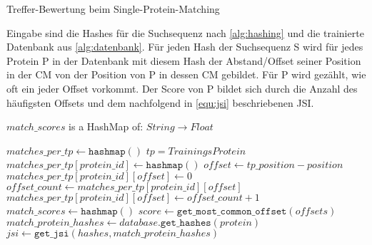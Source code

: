 \begin{enumerate}[a)]
                \newcommand{\Width}{\dimexpr\textwidth-\leftmargin}
                \begin{minipage}{\Width}
                    \begin{algorithm}[H]
                        \caption{Treffer-Bewertung beim Single-Protein-Matching}\label{alg:scoring}
                        Eingabe sind die Hashes für die Suchsequenz nach \autoref{alg:hashing} und die trainierte Datenbank aus \autoref{alg:datenbank}. Für jeden Hash der Suchsequenz S wird für jedes Protein P in der Datenbank mit diesem Hash der Abstand/Offset seiner Position in der \acf{CM} von der Position von P in dessen \acs{CM} gebildet. Für P wird gezählt, wie oft ein jeder Offset vorkommt. Der Score von P bildet sich durch die Anzahl des häufigsten Offsets und dem nachfolgend in \autoref{equ:jsi} beschriebenen \acl{JSI}.
                        \begin{algorithmic}[1]
                            \Ensure $match\_scores$ is a HashMap of: $String \rightarrow Float$

                            \State $matches\_per\_tp \gets \texttt{hashmap}()$ \Comment $tp=Trainings Protein$
                                            \State $matches\_per\_tp[protein\_id] \gets \texttt{hashmap}()$
                                        \EndIf
                                        \State $offset \gets tp\_position - position$
                                            \State $matches\_per\_tp[protein\_id][offset] \gets 0$
                                        \EndIf
                                        \State $offset\_count \gets matches\_per\_tp[protein\_id][offset]$
                                        \State $matches\_per\_tp[protein\_id][offset] \gets offset\_count + 1$
                                    \EndFor
                                \EndIf
                            \EndFor
                            \State $match\_scores \gets \texttt{hashmap}()$
                                \State $score \gets \texttt{get\_most\_common\_offset}(offsets)$
                                \State $match\_protein\_hashes \gets database.\texttt{get\_hashes}(protein)$
                                \State $jsi \gets \texttt{get\_jsi}(hashes, match\_protein\_hashes)$


\end{algorithmic}
\end{algorithm}
\end{minipage}
\end{enumerate}
